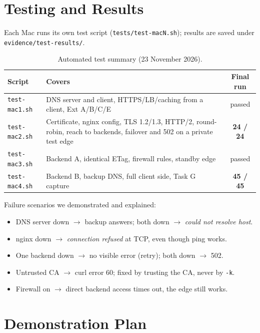\documentclass[11pt,a4paper]{article}
\newcommand{\cmd}[1]{\texttt{#1}}
\begin{document}
\section{Testing and Results}

Each Mac runs its own test script (\cmd{tests/test-macN.sh}); results are
saved under \cmd{evidence/test-results/}.

\begin{table}[h]
\centering
\begin{tabularx}{\textwidth}{l X c}
\toprule
\textbf{Script} & \textbf{Covers} & \textbf{Final run} \\
\midrule
\cmd{test-mac1.sh} & DNS server and client, HTTPS/LB/caching from a client, Ext A/B/C/E & passed \\
\cmd{test-mac2.sh} & Certificate, nginx config, TLS 1.2/1.3, HTTP/2, round-robin, reach to backends, failover and 502 on a private test edge & \textbf{24 / 24} \\
\cmd{test-mac3.sh} & Backend A, identical ETag, firewall rules, standby edge & passed \\
\cmd{test-mac4.sh} & Backend B, backup DNS, full client side, Task G capture & \textbf{45 / 45} \\
\bottomrule
\end{tabularx}
\caption{Automated test summary (23 November 2026).}
\end{table}

\noindent Failure scenarios we demonstrated and explained:
\begin{itemize}
  \item DNS server down $\to$ backup answers; both down $\to$ \emph{could not resolve host}.
  \item nginx down $\to$ \emph{connection refused} at TCP, even though ping works.
  \item One backend down $\to$ no visible error (retry); both down $\to$ 502.
  \item Untrusted CA $\to$ curl error 60; fixed by trusting the CA, never by \cmd{-k}.
  \item Firewall on $\to$ direct backend access times out, the edge still works.
\end{itemize}

\section{Demonstration Plan}
\end{document}
